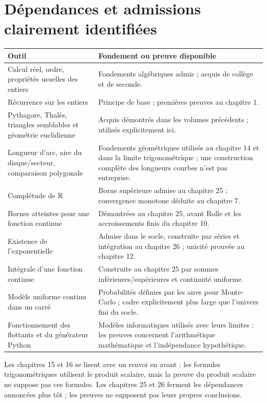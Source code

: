 \documentclass[11pt,a4paper,oneside]{book}
\begin{document}
\section{Dépendances et admissions clairement identifiées}
\begin{longtable}{>{\raggedright\arraybackslash}p{.36\linewidth}>{\raggedright\arraybackslash}p{.54\linewidth}}
\toprule Outil & Fondement ou preuve disponible\\\midrule
Calcul réel, ordre, propriétés usuelles des entiers & Fondements algébriques admis ; acquis de collège et de seconde.\\
Récurrence sur les entiers & Principe de base ; premières preuves au chapitre 1.\\
Pythagore, Thalès, triangles semblables et géométrie euclidienne & Acquis démontrés dans les volumes précédents ; utilisés explicitement ici.\\
Longueur d'arc, aire du disque/secteur, comparaison polygonale & Fondements géométriques utilisés au chapitre 14 et dans la limite trigonométrique ; une construction complète des longueurs courbes n'est pas entreprise.\\
Complétude de $\mathbb{R}$ & Borne supérieure admise au chapitre 25 ; convergence monotone déduite au chapitre 7.\\
Bornes atteintes pour une fonction continue & Démontrées au chapitre 25, avant Rolle et les accroissements finis du chapitre 10.\\
Existence de l'exponentielle & Admise dans le socle, construite par séries et intégration au chapitre 26 ; unicité prouvée au chapitre 12.\\
Intégrale d'une fonction continue & Construite au chapitre 25 par sommes inférieures/supérieures et continuité uniforme.\\
Modèle uniforme continu dans un carré & Probabilités définies par les aires pour Monte-Carlo ; cadre explicitement plus large que l'univers fini du socle.\\
Fonctionnement des flottants et du générateur Python & Modèles informatiques utilisés avec leurs limites ; les preuves concernent l'arithmétique mathématique et l'indépendance hypothétique.\\\bottomrule
\end{longtable}
Les chapitres 15 et 16 se lisent avec un renvoi en avant : les formules
trigonométriques utilisent le produit scalaire, mais la preuve du produit scalaire
ne suppose pas ces formules. Les chapitres 25 et 26 ferment les dépendances
annoncées plus tôt ; les preuves ne supposent pas leurs propres conclusions.
\end{document}

